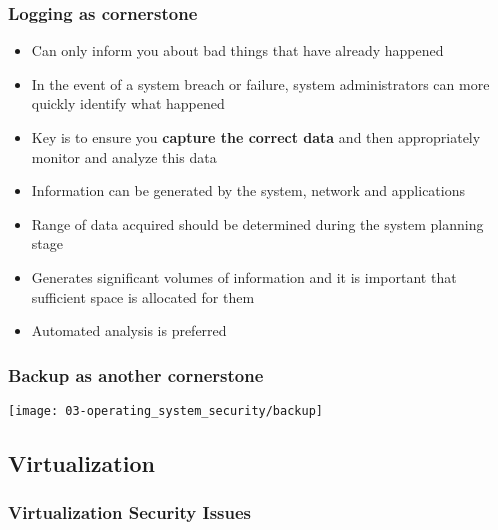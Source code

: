 \subsubsection{Logging as cornerstone}
\begin{itemize}
    \item Can only inform you about bad things that have already happened
    \item In the event of a system breach or failure, system administrators can more quickly identify what happened
    \item Key is to ensure you \textbf{capture the correct data} and then appropriately monitor and analyze this data
    \item Information can be generated by the system, network and applications
    \item Range of data acquired should be determined during the system planning stage
    \item Generates significant volumes of information and it is important that sufficient space is allocated for them
    \item Automated analysis is preferred
\end{itemize}

\subsubsection{Backup as another cornerstone}
\begin{center}
    \vspace{-8pt}
    \texttt{[image: 03-operating\_system\_security/backup]}
    \vspace{-8pt}
\end{center}

\subsection{Virtualization}

\subsubsection{Virtualization Security Issues}

